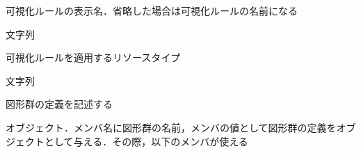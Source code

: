 \begin{description}
{\nopagebreak
\item[\texttt{DisplayName}] \mbox{}
    \vspace{-1zw}
    \begin{description}
    \setlength{\itemsep}{-1.5\itemsep}
    \item[説明] 可視化ルールの表示名．省略した場合は可視化ルールの名前になる
    \item[値] 文字列
    \end{description}
}{\nopagebreak
\item[\texttt{Target}] \mbox{}
    \vspace{-1zw}
    \begin{description}
    \setlength{\itemsep}{-1.5\itemsep}
    \item[説明] 可視化ルールを適用するリソースタイプ
    \item[値] 文字列
    \end{description}
}
\clearpage
{\nopagebreak
\item[\texttt{Shapes}] \mbox{}
    \vspace{-1zw}
    \begin{description}
    \setlength{\itemsep}{-1.5\itemsep}
    \item[説明] 図形群の定義を記述する
    \item[値] オブジェクト．メンバ名に図形群の名前，メンバの値として図形群の定義をオブジェクトとして与える．その際，以下のメンバが使える
    

\end{description}}
\end{description}
